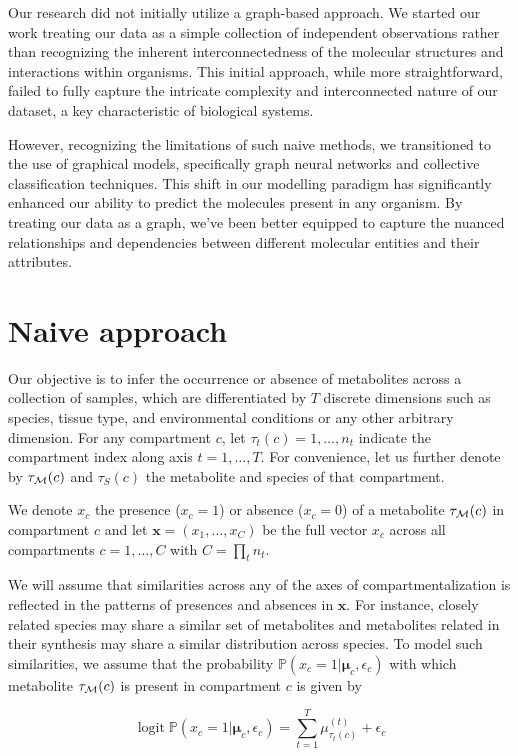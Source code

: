 \documentclass[
11pt, %
oneside, %
english, %
singlespacing, %
headsepline, %
chapterinoneline, %
]{MastersDoctoralThesis} %
\DeclareMathOperator{\logit}{logit}
\def\P{\mathbb{P}}
\def\x{\boldsymbol{x}}
\def\bmu{\boldsymbol{\mu}}
\def\M{{\cal M}}
\begin{document}
Our research did not initially utilize a graph-based approach. We started our work treating our data as a simple collection of independent observations rather than recognizing the inherent interconnectedness of the molecular structures and interactions within organisms. This initial approach, while more straightforward, failed to fully capture the intricate complexity and interconnected nature of our dataset, a key characteristic of biological systems.

However, recognizing the limitations of such naive methods, we transitioned to the use of graphical models, specifically graph neural networks and collective classification techniques. This shift in our modelling paradigm has significantly enhanced our ability to predict the molecules present in any organism. By treating our data as a graph, we've been better equipped to capture the nuanced relationships and dependencies between different molecular entities and their attributes.

\section{Naive approach}\label{sec:methods:Naive approach}
Our objective is to infer the occurrence or absence of metabolites across a collection of samples, which are differentiated by $T$ discrete dimensions such as species, tissue type, and environmental conditions or any other arbitrary dimension. For any compartment $c$, let $\tau_t(c) = 1, \ldots, n_t$ indicate the compartment index along axis $t=1, \ldots, T$. For convenience, let us further denote by $\tau_\M(c)$ and $\tau_S(c)$ the metabolite and species of that compartment.

We denote $x_{c}$ the presence ($x_c=1$) or absence ($x_c=0$) of a metabolite $\tau_\M(c)$ in compartment $c$ and let $\x=(x_1, \ldots, x_C)$ be the full vector $x_c$ across all compartments $c=1, \ldots, C$ with $C=\prod_t n_t$.

We will assume that similarities across any of the axes of compartmentalization is reflected in the patterns of presences and absences in $\x$. For instance, closely related species may share a similar set of metabolites and  metabolites related in their synthesis may share a similar distribution across species. To model such similarities, we assume that the probability $\P(x_c=1|\bmu_c, \epsilon_c)$ with which metabolite $\tau_\M(c)$ is present in compartment $c$ is given by

\begin{equation}\label{eq:logit of X}
	\logit \P(x_c=1|\bmu_c, \epsilon_c) = \sum_{t=1}^{T} \mu^{(t)}_{\tau_t(c)} + \epsilon_{c}
\end{equation}
\end{document}
